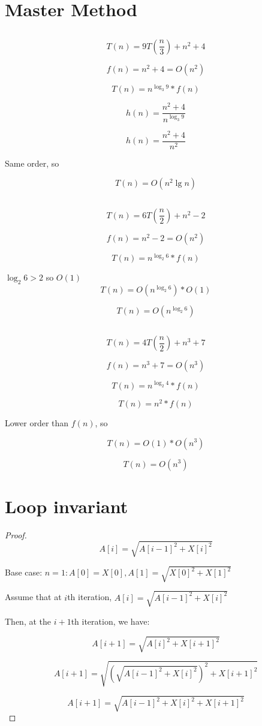\documentclass[a4paper,12pt]{article}
\begin{document}
\section{Master Method}
\subsection{}
$$T(n) = 9 T(\frac{n}{3}) + n^2 + 4$$

$$f(n) = n^2 + 4 = O(n^2)$$

$$T(n) = n^{\log_3 9} * f(n)$$

$$h(n) = \frac{n^2 + 4}{n^{\log_3 9}}$$

$$h(n) = \frac{n^2 + 4}{n^2}$$

Same order, so

$$T(n) = O(n^2\lg n)$$
\subsection{}
$$T(n) = 6 T(\frac{n}{2}) + n^2 - 2$$

$$f(n) = n^2 - 2 = O(n^2)$$

$$T(n) = n^{\log_2 6} * f(n)$$

$\log_2 6 > 2$ so $O(1)$
$$T(n) = O(n^{\log_2 6}) * O(1)$$

$$T(n) = O(n^{\log_2 6})$$

\subsection{}
$$T(n) = 4 T(\frac{n}{2}) + n^3 + 7$$

$$f(n) = n^3 + 7 = O(n^3)$$

$$T(n) = n^{\log_2 4} * f(n)$$

$$T(n) = n^2 * f(n)$$

Lower order than $f(n)$, so

$$T(n) = O(1) * O(n^3)$$

$$T(n) = O(n^3)$$

\section{Loop invariant}
\begin{proof}
$$A{[i]} = \sqrt{A{[i-1]}^2 + X{[i]}^2}$$

Base case: $n = 1: A{[0]} = X{[0]}, A{[1]} = \sqrt{X{[0]}^2 + X{[1]}^2}$

Assume that at $i$th iteration, $A[i] = \sqrt{A[i - 1]^2 + X[i]^2}$

Then, at the $i+1$th iteration, we have:

$$A[i + 1] = \sqrt{A[i]^2 + X[i+1]^2}$$

$$A[i + 1] = \sqrt{(\sqrt{A[i - 1]^2 + X[i]^2})^2 + X[i+1]^2}$$

$$A[i + 1] = \sqrt{A[i - 1]^2 + X[i]^2 + X[i+1]^2}$$
\end{proof}
\end{document}
